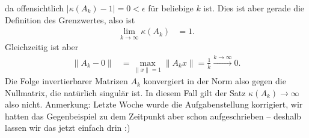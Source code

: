 \documentclass[english, parskip=full]{scrartcl}
\begin{document}
da offensichtlich $|\kappa(A_k) - 1 | = 0 < \epsilon$ für beliebige $k$ ist.
Dies ist aber gerade die Definition des Grenzwertes, also ist 
\begin{align}
\lim_{k\rightarrow\infty}\kappa (A_k) &= 1.
\end{align}
Gleichzeitig ist aber
\begin{align}
\| A_k - 0\| &= \max_{\|x\| = 1} \|A_kx\| = \frac{1}{k} \overset{k\rightarrow\infty}{\longrightarrow} 0.
\end{align}
Die Folge invertierbarer Matrizen $A_k$ konvergiert in der Norm also gegen die Nullmatrix, die natürlich singulär ist.
In diesem Fall gilt der Satz $\kappa(A_k)\rightarrow\infty$ also nicht.
Anmerkung: Letzte Woche wurde die Aufgabenstellung korrigiert, wir hatten das Gegenbeispiel zu dem Zeitpunkt aber schon aufgeschrieben -- deshalb lassen wir das jetzt einfach drin :)
\end{document}
